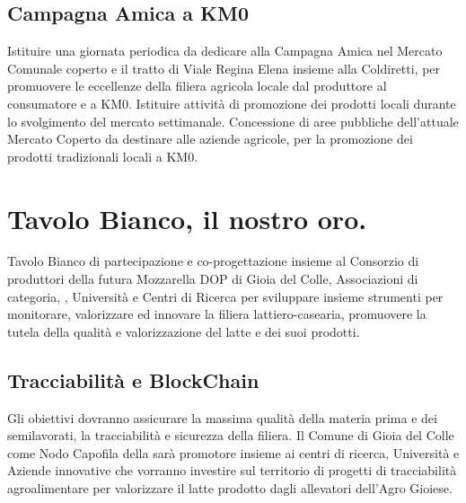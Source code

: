\documentclass[a4paper,14pt,italian]{sphinxmanual}
\begin{document}
\subsection{Campagna Amica a KM0}
\label{\detokenize{agricoltura:campagna-amica-a-km0}}

Istituire una giornata periodica da dedicare alla Campagna Amica nel Mercato Comunale coperto e il tratto di Viale Regina Elena insieme alla Coldiretti, per promuovere le eccellenze della filiera agricola locale dal produttore al consumatore e a KM0.
Istituire attività di promozione dei prodotti locali durante lo svolgimento del mercato settimanale.
Concessione di aree pubbliche dell’attuale Mercato Coperto da destinare alle aziende agricole, per la promozione dei prodotti tradizionali locali a KM0.


\section{Tavolo Bianco, il nostro oro.}
\label{\detokenize{agricoltura:tavolo-bianco-il-nostro-oro}}

Tavolo Bianco di partecipazione e co-progettazione insieme al Consorzio di produttori della futura Mozzarella DOP di Gioia del Colle, Associazioni di categoria, , Università e Centri di Ricerca per sviluppare insieme strumenti per monitorare, valorizzare ed innovare la filiera lattiero-casearia, promuovere la tutela della qualità e valorizzazione del latte e dei suoi prodotti.


\subsection{Tracciabilità e BlockChain}
\label{\detokenize{agricoltura:tracciabilita-e-blockchain}}

Gli obiettivi dovranno assicurare la massima qualità della materia prima e dei semilavorati, la tracciabilità e sicurezza della filiera.
Il Comune di Gioia del Colle come Nodo Capofila della  sarà promotore insieme ai centri di ricerca, Università e Aziende innovative che vorranno investire sul territorio di progetti di tracciabilità agroalimentare per valorizzare il latte prodotto dagli allevatori dell’Agro Gioiese.
\end{document}
